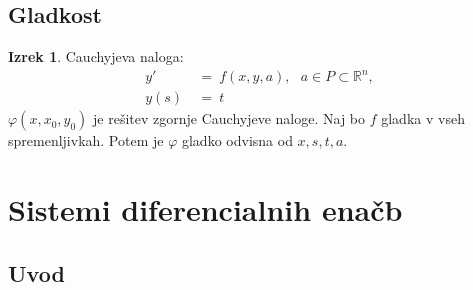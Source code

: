 \documentclass[11pt]{article}
\newcommand{\R}{\mathbb{R}}
\newcommand{\0}{\mathbf{0}}
\theoremstyle{definition}
\theoremstyle{definition}
\theoremstyle{definition}
\newtheorem{izrek}{Izrek}[section]
\theoremstyle{definition}
\begin{document}

\subsection{Gladkost}
\vspace{0.5cm}

\begin{izrek}

Cauchyjeva naloga:
\begin{align*}
y' ~&=~ f(x,y,a), ~~~a \in P \subset \R^n, \\
y(s) ~&=~ t
\end{align*}
$\varphi(x,x_0,y_0)$ je rešitev zgornje Cauchyjeve naloge.
Naj bo $f$ gladka v vseh spremenljivkah. Potem je $\varphi$ gladko odvisna od $x,s,t,a$.

\end{izrek}
\vspace{0.5cm}


\pagebreak


\section{Sistemi diferencialnih enačb}
\vspace{0.5cm}


\subsection{Uvod}
\vspace{0.5cm}
\end{document}
